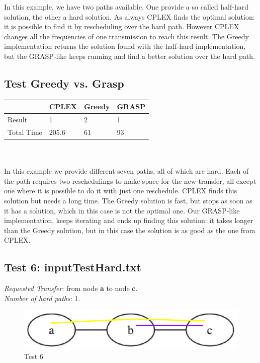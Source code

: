 \documentclass[11pt,a4paper]{article}
\begin{document}
In this example, we have two paths available. One provide a so called half-hard solution, the other a hard solution. As always CPLEX finds the optimal solution: it is possible to find it by rescheduling over the hard path. However CPLEX changes all the frequencies of one transmission to reach this result. The Greedy implementation returns the solution found with the half-hard implementation, but the GRASP-like keeps running and find a better solution over the hard path.

\subsection{Test Greedy vs. Grasp}

\begin{tabular}{| l | l | l | l |}
\hline
 & CPLEX & Greedy & GRASP \\ \hline
Result & 1 & 2 & 1 \\ \hline
Total Time & 205.6 & 61 & 93 \\ \hline
\end{tabular}\\\\

In this example we provide different seven paths, all of which are hard. Each of the path requires two reschedulings to make space for the new transfer, all except one where it is possible to do it with just one reschedule. CPLEX finds this solution but needs a long time. The Greedy solution is fast, but stops as soon as it has a solution, which in this case is not the optimal one. Our GRASP-like implementation, keeps iterating and ends up finding this solution: it takes longer than the Greedy solution, but in this case the solution is as good as the one from CPLEX.

\subsection{Test 6: inputTestHard.txt}

\textit{Requested Transfer}: from node \textbf{a} to node \textbf{c}.\\
\textit{Number of hard paths}: 1.\\

\begin{figure}[H]
  \centering
    \includegraphics[scale=0.7]{inputTestHard.png}
  \caption{Test 6}
  \label{fig:test6}
\end{figure}
\end{document}

